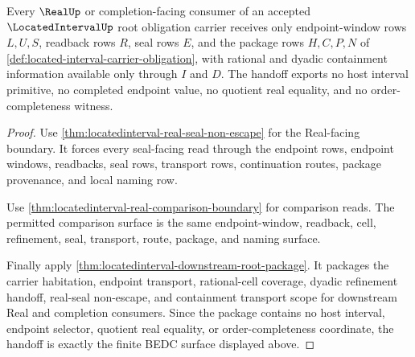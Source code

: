 \begin{theorem}
\label{thm:located-interval-real-handoff}
Every $\RealUp$ or completion-facing consumer of an accepted $\LocatedIntervalUp$ root obligation carrier receives only endpoint-window rows $L,U,S$, readback rows $R$, seal rows $E$, and the package rows $H,C,P,N$ of \autoref{def:located-interval-carrier-obligation}, with rational and dyadic containment information available only through $I$ and $D$. The handoff exports no host interval primitive, no completed endpoint value, no quotient real equality, and no order-completeness witness.
\end{theorem}
\begin{proof}
Use \autoref{thm:locatedinterval-real-seal-non-escape} for the Real-facing boundary. It forces every seal-facing read through the endpoint rows, endpoint windows, readbacks, seal rows, transport rows, continuation routes, package provenance, and local naming row.

Use \autoref{thm:locatedinterval-real-comparison-boundary} for comparison reads. The permitted comparison surface is the same endpoint-window, readback, cell, refinement, seal, transport, route, package, and naming surface.

Finally apply \autoref{thm:locatedinterval-downstream-root-package}. It packages the carrier habitation, endpoint transport, rational-cell coverage, dyadic refinement handoff, real-seal non-escape, and containment transport scope for downstream Real and completion consumers. Since the package contains no host interval, endpoint selector, quotient real equality, or order-completeness coordinate, the handoff is exactly the finite BEDC surface displayed above.
\end{proof}

